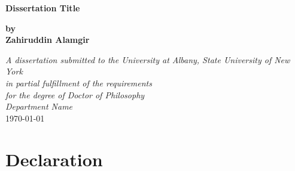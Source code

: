\documentclass[letterpaper,12pt,openany]{report}
\begin{document}
\begin{titlepage}
\begin{center}

\vspace*{.01\textheight}


\huge\textbf{Dissertation Title}
        
        \vspace{0.5cm}
      
       \Large \textbf{by}\\
        \Large\textbf{Zahiruddin Alamgir}
        
        \vspace{0.6cm}
    
\large \textit{A dissertation submitted to the University at Albany, State University of New York\\in partial fulfillment of the requirements\\ for the degree of Doctor of Philosophy}\\[0.3cm] %
\textit{Department Name}\\[0.3cm] %

\today

\vfill
\end{center}
\end{titlepage}



\setcounter{page}{2} %

\chapter*{\centering Declaration}
\end{document}
